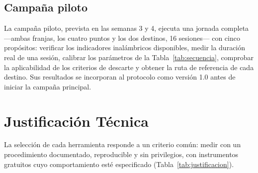 \subsection{Campaña piloto}

La campaña piloto, prevista en las semanas 3 y 4, ejecuta una jornada completa ---ambas franjas, los cuatro puntos y los dos destinos, 16 sesiones--- con cinco propósitos: verificar los indicadores inalámbricos disponibles, medir la duración real de una sesión, calibrar los parámetros de la Tabla~\ref{tab:secuencia}, comprobar la aplicabilidad de los criterios de descarte y obtener la ruta de referencia de cada destino. Sus resultados se incorporan al protocolo como versión 1.0 antes de iniciar la campaña principal. 

\section{Justificación Técnica}

La selección de cada herramienta responde a un criterio común: medir con un procedimiento documentado, reproducible y sin privilegios, con instrumentos gratuitos cuyo comportamiento esté especificado (Tabla~\ref{tab:justificacion}).

